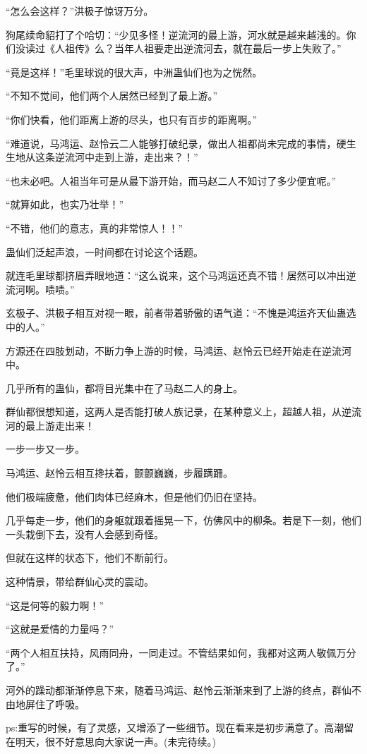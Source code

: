 \begin{this_body}
“怎么会这样？”洪极子惊讶万分。

狗尾续命貂打了个哈切：“少见多怪！逆流河的最上游，河水就是越来越浅的。你们没读过《人祖传》么？当年人祖要走出逆流河去，就在最后一步上失败了。”

“竟是这样！”毛里球说的很大声，中洲蛊仙们也为之恍然。

“不知不觉间，他们两个人居然已经到了最上游。”

“你们快看，他们距离上游的尽头，也只有百步的距离啊。”

“难道说，马鸿运、赵怜云二人能够打破纪录，做出人祖都尚未完成的事情，硬生生地从这条逆流河中走到上游，走出来？！”

“也未必吧。人祖当年可是从最下游开始，而马赵二人不知讨了多少便宜呢。”

“就算如此，也实乃壮举！”

“不错，他们的意志，真的非常惊人！！”

蛊仙们泛起声浪，一时间都在讨论这个话题。

就连毛里球都挤眉弄眼地道：“这么说来，这个马鸿运还真不错！居然可以冲出逆流河啊。啧啧。”

玄极子、洪极子相互对视一眼，前者带着骄傲的语气道：“不愧是鸿运齐天仙蛊选中的人。”

方源还在四肢划动，不断力争上游的时候，马鸿运、赵怜云已经开始走在逆流河中。

几乎所有的蛊仙，都将目光集中在了马赵二人的身上。

群仙都很想知道，这两人是否能打破人族记录，在某种意义上，超越人祖，从逆流河的最上游走出来！

一步一步又一步。

马鸿运、赵怜云相互搀扶着，颤颤巍巍，步履蹒跚。

他们极端疲惫，他们肉体已经麻木，但是他们仍旧在坚持。

几乎每走一步，他们的身躯就跟着摇晃一下，仿佛风中的柳条。若是下一刻，他们一头栽倒下去，没有人会感到奇怪。

但就在这样的状态下，他们不断前行。

这种情景，带给群仙心灵的震动。

“这是何等的毅力啊！”

“这就是爱情的力量吗？”

“两个人相互扶持，风雨同舟，一同走过。不管结果如何，我都对这两人敬佩万分了。”

河外的躁动都渐渐停息下来，随着马鸿运、赵怜云渐渐来到了上游的终点，群仙不由地屏住了呼吸。

ps:重写的时候，有了灵感，又增添了一些细节。现在看来是初步满意了。高潮留在明天，很不好意思向大家说一声。(未完待续。)

\end{this_body}

